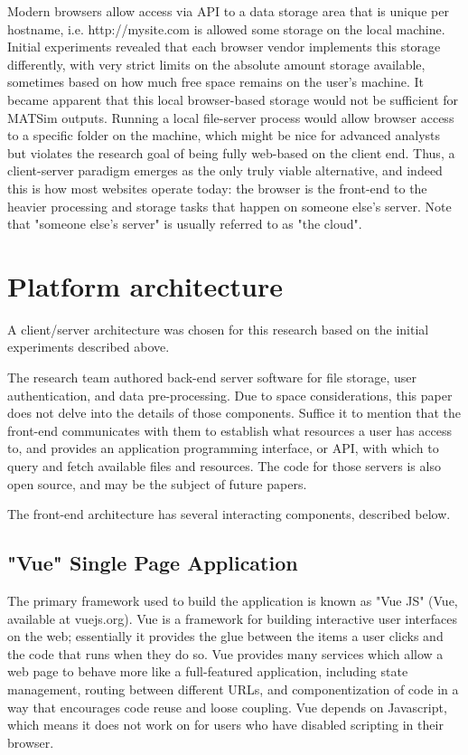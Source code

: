 \documentclass[Afour,sagev,times]{sagej}
\begin{document}
Modern browsers allow access via API to a data storage area that is unique per hostname, i.e. http://mysite.com is allowed some storage on the local machine. Initial experiments revealed that each browser vendor implements this storage differently, with very strict limits on the absolute amount storage available, sometimes based on how much free space remains on the user's machine. It became apparent that this local browser-based storage would not be sufficient for MATSim outputs. Running a local file-server process would allow browser access to a specific folder on the machine, which might be nice for advanced analysts but violates the research goal of being fully web-based on the client end. Thus, a client-server paradigm emerges as the only truly viable alternative, and indeed this is how most websites operate today: the browser is the front-end to the heavier processing and storage tasks that happen on someone else's server. Note that "someone else's server" is usually referred to as "the cloud".

\section{Platform architecture}

A client/server architecture was chosen for this research based on the initial experiments described above.

The research team authored back-end server software for file storage, user authentication, and data pre-processing. Due to space considerations, this paper does not delve into the details of those components. Suffice it to mention that the front-end communicates with them to establish what resources a user has access to, and provides an application programming interface, or API, with which to query and fetch available files and resources. The code for those servers is also open source, and may be the subject of future papers.

The front-end architecture has several interacting components, described below.

\subsection{"Vue" Single Page Application}

The primary framework used to build the application is known as "Vue JS" (Vue, available at vuejs.org). Vue is a framework for building interactive user interfaces on the web; essentially it provides the glue between the items a user clicks and the code that runs when they do so. Vue provides many services which allow a web page to behave more like a full-featured application, including state management, routing between different URLs, and componentization of code in a way that encourages code reuse and loose coupling. Vue depends on Javascript, which means it does not work on for users who have disabled scripting in their browser.
\end{document}
